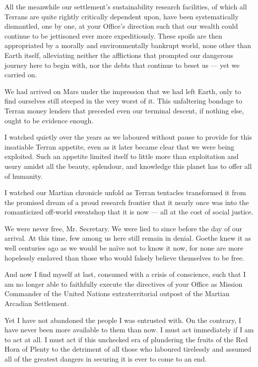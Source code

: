 All the meanwhile our settlement's sustainability research facilities, of which all Terrans are quite rightly critically dependent upon, have been systematically dismantled, one by one, at your Office's direction such that our wealth could continue to be jettisoned ever more expeditiously. These spoils are then appropriated by a morally and environmentally bankrupt world, none other than Earth itself, alleviating neither the afflictions that prompted our dangerous journey here to begin with, nor the debts that continue to beset us — yet we carried on.

We had arrived on Mars under the impression that we had left Earth, only to find ourselves still steeped in the very worst of it. This unfaltering bondage to Terran money lenders that preceded even our terminal descent, if nothing else, ought to be evidence enough.

I watched quietly over the years as we laboured without pause to provide for this insatiable Terran appetite, even as it later became clear that we were being exploited. Such an appetite limited itself to little more than exploitation and usury amidst all the beauty, splendour, and knowledge this planet has to offer all of humanity. 

I watched our Martian chronicle unfold as Terran tentacles transformed it from the promised dream of a proud research frontier that it nearly once was into the romanticized off-world sweatshop that it is now — all at the cost of social justice.

We were never free, Mr. Secretary. We were lied to since before the day of our arrival. At this time, few among us here still remain in denial. Goethe knew it as well centuries ago as we would be naïve not to know it now, for none are more hopelessly enslaved than those who would falsely believe themselves to be free.

And now I find myself at last, consumed with a crisis of conscience, such that I am no longer able to faithfully execute the directives of your Office as Mission Commander of the United Nations extraterritorial outpost of the Martian Arcadian Settlement. 

Yet I have not abandoned the people I was entrusted with. On the contrary, I have never been more available to them than now. I must act immediately if I am to act at all. I must act if this unchecked era of plundering the fruits of the Red Horn of Plenty to the detriment of all those who laboured tirelessly and assumed all of the greatest dangers in securing it is ever to come to an end.

